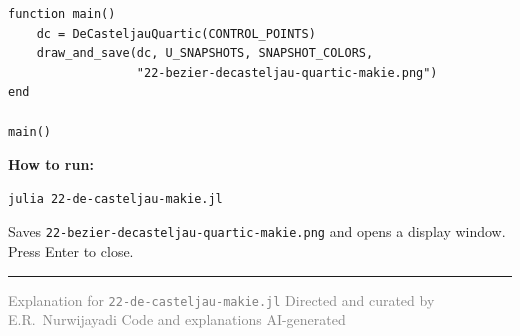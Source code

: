 \documentclass[12pt, a4paper]{article}
\newcommand{\cd}[1]{\texttt{#1}}
\begin{document}
\begin{verbatim}
function main()
    dc = DeCasteljauQuartic(CONTROL_POINTS)
    draw_and_save(dc, U_SNAPSHOTS, SNAPSHOT_COLORS,
                  "22-bezier-decasteljau-quartic-makie.png")
end

main()
\end{verbatim}

\begin{notebox}
\textbf{How to run:}
\begin{verbatim}
julia 22-de-casteljau-makie.jl
\end{verbatim}
Saves \cd{22-bezier-decasteljau-quartic-makie.png}
and opens a display window.
Press Enter to close.
\end{notebox}

\vspace{2em}\hrule\vspace{0.5em}
{\small\textcolor{gray}{%
Explanation for \texttt{22-de-casteljau-makie.jl}
\textbar{} Directed and curated by E.R.\ Nurwijayadi
\textbar{} Code and explanations AI-generated}}
\end{document}
